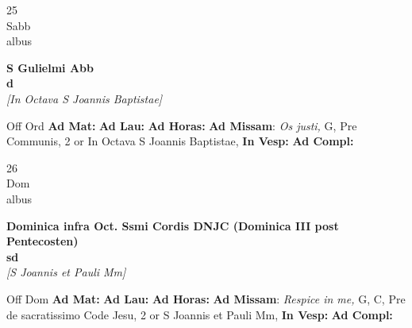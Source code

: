 \documentclass[10pt, openany]{book}
\begin{document}
        \begin{center}
            \begin{minipage}{3.5in}
                \vspace{2em}
                \begin{minipage}{0.5in}
                    {\Huge 25} \\
                    {\normalsize Sabb} \\
                    {\normalsize albus}
                \end{minipage}
                \begin{minipage}{3.0in}
                    \textbf{ \large S Gulielmi Abb \\
                    \textnormal{\normalsize d}} \\ \textit{[In Octava S Joannis Baptistae]} \\ 
                \end{minipage}
                \begin{justify}Off Ord
                    \textbf{Ad Mat: }
                    \textbf{Ad Lau: }
                    \textbf{Ad Horas: }\textbf{Ad Missam}: \textit{Os justi,} G, Pre Communis, 2 or In Octava S Joannis Baptistae,  
                    \textbf{In Vesp: }
                    \textbf{Ad Compl: }
                \end{justify}
            \end{minipage}
        \end{center}
    
        \begin{center}
            \begin{minipage}{3.5in}
                \vspace{2em}
                \begin{minipage}{0.5in}
                    {\Huge 26} \\
                    {\normalsize Dom} \\
                    {\normalsize albus}
                \end{minipage}
                \begin{minipage}{3.0in}
                    \textbf{ \large Dominica infra Oct. Ssmi Cordis DNJC (Dominica III post Pentecosten) \\
                    \textnormal{\normalsize sd}} \\ \textit{[S Joannis et Pauli Mm]} \\ 
                \end{minipage}
                \begin{justify}Off Dom
                    \textbf{Ad Mat: }
                    \textbf{Ad Lau: }
                    \textbf{Ad Horas: }\textbf{Ad Missam}: \textit{Respice in me,} G, C, Pre de sacratissimo Code Jesu, 2 or S Joannis et Pauli Mm,  
                    \textbf{In Vesp: }
                    \textbf{Ad Compl: }
                \end{justify}
            \end{minipage}
        \end{center}
    
\end{document}
